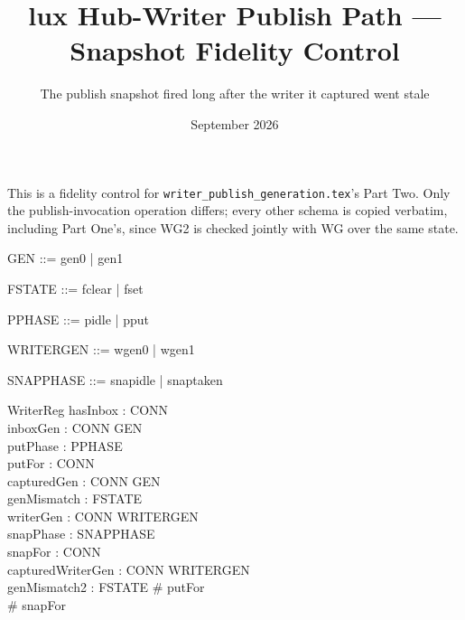 \documentclass[a4paper,10pt,fleqn]{article}
\begin{document}
\title{lux Hub-Writer Publish Path --- Snapshot Fidelity Control}
\author{The publish snapshot fired long after the writer it captured went stale}
\date{September 2026}
\maketitle

This is a fidelity control for \texttt{writer\_publish\_generation.tex}'s
Part Two. Only the publish-invocation operation differs; every other schema
is copied verbatim, including Part One's, since WG2 is checked jointly with
WG over the same state.

\begin{zed}
  [CONN]
\end{zed}

\begin{zed}
  GEN ::= gen0 | gen1
\end{zed}

\begin{zed}
  FSTATE ::= fclear | fset
\end{zed}

\begin{zed}
  PPHASE ::= pidle | pput
\end{zed}

\begin{zed}
  WRITERGEN ::= wgen0 | wgen1
\end{zed}

\begin{zed}
  SNAPPHASE ::= snapidle | snaptaken
\end{zed}

\begin{schema}{WriterReg}
  hasInbox : \power CONN \\
  inboxGen : CONN \fun GEN \\
  putPhase : PPHASE \\
  putFor : \power CONN \\
  capturedGen : CONN \fun GEN \\
  genMismatch : FSTATE \\
  writerGen : CONN \fun WRITERGEN \\
  snapPhase : SNAPPHASE \\
  snapFor : \power CONN \\
  capturedWriterGen : CONN \fun WRITERGEN \\
  genMismatch2 : FSTATE
\where
  \# putFor  \\
  \# snapFor 
\end{schema}
\end{document}
